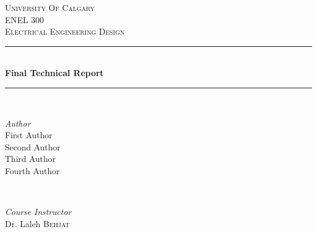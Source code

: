 
\begin{titlepage} %
    \newcommand{\HRule}{\rule{\linewidth}{0.5mm}} %
    

    \center %
    
    
    \textsc{\LARGE University Of Calgary}\\[1.5cm] %
    
    \textsc{\Large ENEL 300}\\[0.5cm] %
    
    \textsc{\large Electrical Engineering Design}\\[0.5cm] %
    
    \HRule\\[0.4cm]
    
    {\huge\bfseries Final Technical Report}\\[0.4cm] %
    
    \HRule\\[1.5cm]
    
    \begin{minipage}{0.4\textwidth}
        \begin{flushleft}
            \large
            \textit{Author}\\
            First Author  \\ %
            Second Author \\ %
            Third Author  \\ %
            Fourth Author    %
        \end{flushleft}
    \end{minipage}
    ~
    \begin{minipage}{0.4\textwidth}
        \begin{flushright}
            \large
            \textit{Course Instructor}\\
            Dr. Laleh \textsc{Behjat} %
        \end{flushright}
    \end{minipage}
    

\end{titlepage}
